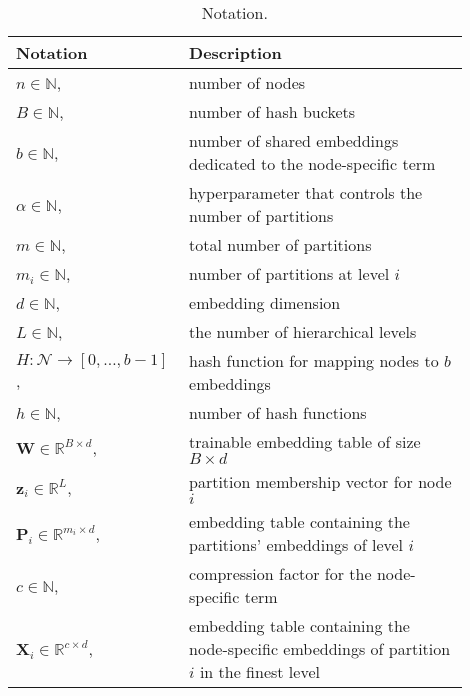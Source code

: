 \documentclass[conference]{IEEEtran}
\begin{document}

\begin{table} %
	\centering
	\caption{Notation.}
	\begin{tabular}{ p{0.3\linewidth} p{0.6\linewidth}} 
	    \toprule
	    Notation & Description \\
	    \midrule
		$n \in \mathbb{N}$, & number of nodes\\
		$B \in \mathbb{N}$, & number of hash buckets\\
		$b \in \mathbb{N}$, & number of shared embeddings dedicated to the node-specific term\\
		$\alpha\in \mathbb{N}$, & hyperparameter that controls the number of partitions\\
		$m \in \mathbb{N}$, & total number of partitions\\
		$m_i \in \mathbb{N}$, & number of partitions at level $i$\\
		$d \in \mathbb{N}$, & embedding dimension\\
		$L \in \mathbb{N}$, & the number of hierarchical levels\\
		\mbox{$H:\mathcal{N} \rightarrow [0,\dots,b-1]$}, & hash function for mapping nodes to $b$ embeddings\\
		$h \in \mathbb{N}$, & number of hash functions\\
		$\mathbf{W}\in \mathbb{R}^{B\times d}$, & trainable embedding table of size $B\times d$\\
		$\mathbf{z}_i \in \mathbb{R}^L$, & partition membership vector for node $i$\\
		$\mathbf{P}_i \in \mathbb{R}^{m_i \times d}$, & embedding table containing the partitions' embeddings of level $i$\\
		$c \in \mathbb{N}$, & compression factor for the node-specific term\\
		$\mathbf{X}_i \in \mathbb{R}^{c \times d}$, & embedding table containing the node-specific embeddings of partition $i$ in the finest level\\
		\bottomrule
	\end{tabular}
	\label{table:notation}
\end{table}
\end{document}
